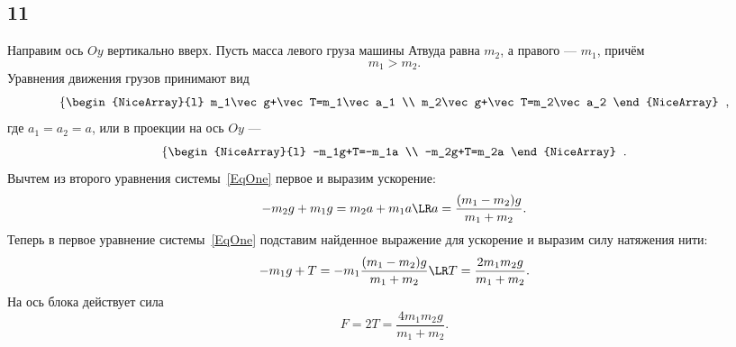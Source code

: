 \subsection{11}

Направим ось $Oy$ вертикально вверх. Пусть масса левого груза машины Атвуда равна $m_2$, а правого --- $m_1$, причём
\[
m_1>m_2.
\]
Уравнения движения грузов принимают вид
\[
\left\{
\begin{NiceArray}{l}
m_1\vec g+\vec T=m_1\vec a_1 \\
m_2\vec g+\vec T=m_2\vec a_2
\end{NiceArray}
\right.\;,
\]
где $a_1=a_2=a$, или в проекции на ось $Oy$ ---
\begin{equation}\label{EqOne}
\left\{
\begin{NiceArray}{l}
-m_1g+T=-m_1a \\
-m_2g+T=m_2a
\end{NiceArray}
\right.\;.
\end{equation}
Вычтем из второго уравнения системы~\eqref{EqOne} первое и выразим ускорение:
\[
-m_2g+m_1g=m_2a+m_1a\LR a=\frac{(m_1-m_2)g}{m_1+m_2}.
\]
Теперь в первое уравнение системы~\eqref{EqOne} подставим найденное выражение для ускорение и выразим силу натяжения нити:
\[
-m_1g+T=-m_1\frac{(m_1-m_2)g}{m_1+m_2}\LR T=\frac{2m_1m_2g}{m_1+m_2}.
\]
На ось блока действует сила
\[
F=2T=\frac{4m_1m_2g}{m_1+m_2}.
\]